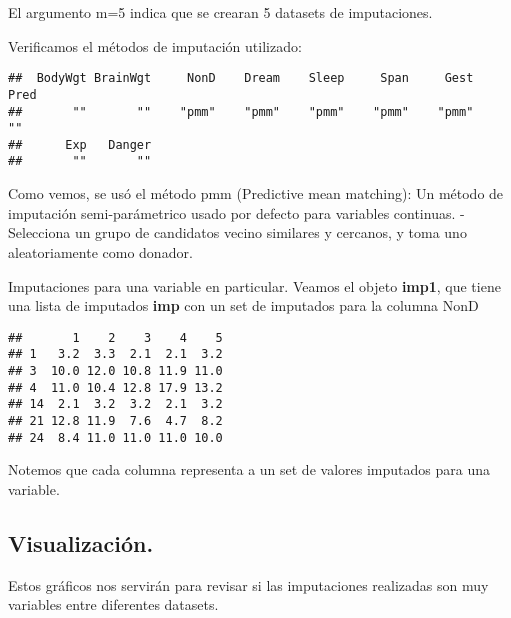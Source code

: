 \documentclass[
]{article}
\newenvironment{Shaded}{\begin{snugshade}}{\end{snugshade}}
\newcommand{\FunctionTok}[1]{\textcolor[rgb]{0.00,0.00,0.00}{#1}}
\newcommand{\NormalTok}[1]{#1}
\newcommand{\SpecialCharTok}[1]{\textcolor[rgb]{0.00,0.00,0.00}{#1}}
\begin{document}
El argumento m=5 indica que se crearan 5 datasets de imputaciones.

Verificamos el métodos de imputación utilizado:

\begin{Shaded}
\end{Shaded}

\begin{verbatim}
##  BodyWgt BrainWgt     NonD    Dream    Sleep     Span     Gest     Pred 
##       ""       ""    "pmm"    "pmm"    "pmm"    "pmm"    "pmm"       "" 
##      Exp   Danger 
##       ""       ""
\end{verbatim}

Como vemos, se usó el método pmm (Predictive mean matching): Un método
de imputación semi-parámetrico usado por defecto para variables
continuas. - Selecciona un grupo de candidatos vecino similares y
cercanos, y toma uno aleatoriamente como donador.

Imputaciones para una variable en particular. Veamos el objeto
\textbf{imp1}, que tiene una lista de imputados \textbf{imp} con un set
de imputados para la columna NonD

\begin{Shaded}
\end{Shaded}

\begin{verbatim}
##       1    2    3    4    5
## 1   3.2  3.3  2.1  2.1  3.2
## 3  10.0 12.0 10.8 11.9 11.0
## 4  11.0 10.4 12.8 17.9 13.2
## 14  2.1  3.2  3.2  2.1  3.2
## 21 12.8 11.9  7.6  4.7  8.2
## 24  8.4 11.0 11.0 11.0 10.0
\end{verbatim}

Notemos que cada columna representa a un set de valores imputados para
una variable.

\hypertarget{visualizaciuxf3n.}{%
\subsection{Visualización.}\label{visualizaciuxf3n.}}

Estos gráficos nos servirán para revisar si las imputaciones realizadas
son muy variables entre diferentes datasets.
\end{document}
